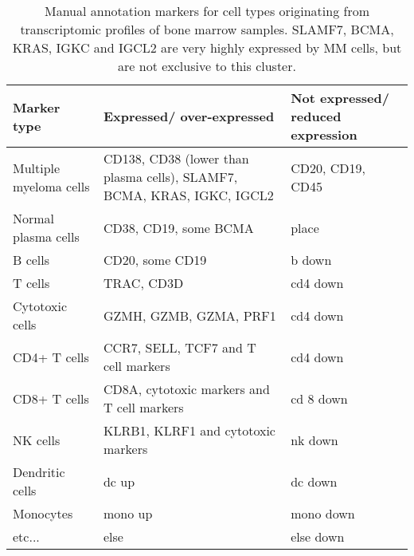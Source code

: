 \begin{table}[h]
    \centering
\begin{tabular}{|p{2cm}|p{6cm}|p{5cm}|}
\hline
\textbf{Marker type}     & \textbf{Expressed/ over-expressed}                                                                      & \textbf{Not expressed/ reduced expression} \\ \hline
Multiple myeloma cells & CD138, CD38 (lower than plasma cells), SLAMF7,  BCMA, KRAS, IGKC, IGCL2                                   & CD20, CD19, CD45                       \\ \hline
Normal plasma cells    & CD38, CD19, some BCMA                                                                                     & place                                    \\ \hline
B cells                & CD20, some CD19                                                                                           & b down                                   \\ \hline
T cells                &  TRAC, CD3D                                                                                               & cd4 down                                 \\ \hline
Cytotoxic cells        &  GZMH,  GZMB,  GZMA,  PRF1                                                                                & cd4 down                                 \\ \hline
CD4+ T cells           & CCR7, SELL, TCF7 and T cell markers                                                                       & cd4 down                                 \\ \hline
CD8+ T cells           & CD8A, cytotoxic markers and T cell markers                                                                & cd 8 down                                \\ \hline
NK cells               & KLRB1,  KLRF1 and cytotoxic markers                                                                       & nk down                                  \\ \hline
Dendritic cells        & dc up                                                                                                     & dc down                                  \\ \hline
Monocytes              & mono up                                                                                                   & mono down                                \\ \hline
etc...                 & else                                                                                                      & else down                                \\ \hline
\end{tabular}
\caption[Manual annotation markers]{Manual annotation markers for cell types originating from transcriptomic profiles of bone marrow samples.
SLAMF7, BCMA, KRAS, IGKC and IGCL2 are very highly expressed by MM cells, but are not exclusive to this cluster. }
\label{tab:annotation_markers}
\end{table}